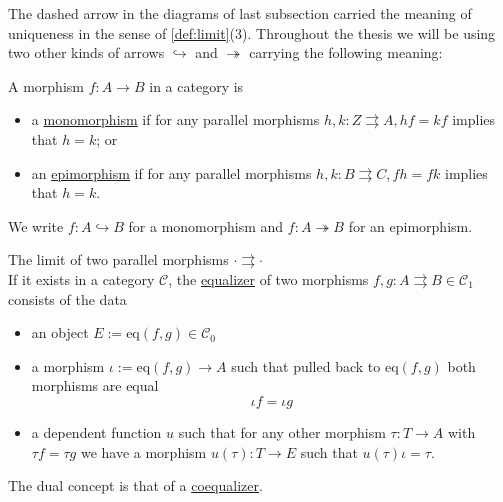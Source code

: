 The dashed arrow in the diagrams of last subsection carried the meaning of uniqueness in the sense of \ref{def:limit}(3).
Throughout the thesis we will be using two other kinds of arrows $\hookrightarrow$ and $\twoheadrightarrow$ carrying the
following meaning:

\begin{definition}
A morphism $f : A \rightarrow B$ in a category is
\begin{itemize}
\item a \ul{monomorphism} if for any parallel morphisms $h, k : Z \rightrightarrows A, hf = kf$ implies that
$h = k$; or
\item an \ul{epimorphism} if for any parallel morphisms $h, k : B \rightrightarrows C, fh = fk$ implies that
$h = k$.
\end{itemize}
We write $f : A \hookrightarrow B$ for a monomorphism and $f : A \twoheadrightarrow B$ for an epimorphism.
\end{definition}

\begin{definition}
The limit of two parallel morphisms $\cdot \rightrightarrows \cdot$\\
If it exists in a category $\mathcal{C}$, the \ul{equalizer} of two morphisms $f, g : A \rightrightarrows B \in \mathcal{C}_{1}$
consists of the data
\begin{itemize}
\item an object $E := \mathrm{eq}(f,g) \in \mathcal{C}_{0}$
\item a morphism $\iota := \mathrm{eq}(f,g) \rightarrow A$ such that pulled back to
$\mathrm{eq}(f,g)$ both morphisms are equal
\[
\iota f = \iota g
\]
\item a dependent function $u$ such that for any other morphism $\tau : T \rightarrow A$ with $\tau f = \tau g$
we have a morphism $u( \tau ) : T \rightarrow E$ such that $u( \tau ) \iota = \tau$.
\end{itemize}
The dual concept is that of a \ul{coequalizer}.
\end{definition}


